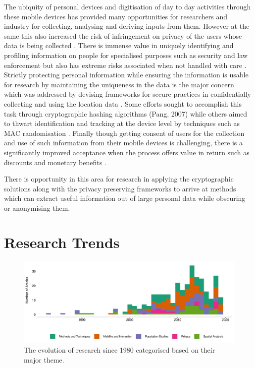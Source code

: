The ubiquity of personal devices and digitisation of day to day activities through these mobile devices \citep{mcmeel2018} has provided many opportunities for researchers and industry for collecting, analysing and deriving inputs from them.
However at the same this also increased the risk of infringement on privacy of the users whose data is being collected \cite[-2cm]{saponas2007, krumm2009}.
There is immense value in uniquely identifying and profiling information on people for specialised purposes such as security \citep{cutter2006} and law enforcement \citep{dobson2003} but also has extreme risks associated when not handled with care \citep{vanwey2005}.
Strictly protecting personal information while ensuring the information is usable for research by maintaining the uniqueness in the data is the major concern which was addressed by devising frameworks for secure practices in confidentially collecting and using the location data \citep{duckham2006, tang2006, lane2014}.  Some efforts sought to accomplish this task through cryptographic hashing algorithms (Pang, 2007) while others aimed to thwart identification and tracking at the device level by techniques such as MAC randomisation \citep{gruteser2005, greenstein2008}.
Finally though getting consent of users for the collection and use of such information from their mobile devices is challenging, there is a significantly improved acceptance when the process offers value in return such as discounts and monetary benefits \citep{kobsa2014}.

There is opportunity in this area for research in applying the cryptographic solutions along with the privacy preserving frameworks to arrive at methods which can extract useful information out of large personal data while obscuring or anonymising them.

\section{Research Trends}

\begin{figure}
  \includegraphics{images/literature-themes-timeline.png}
  \caption{The evolution of research since 1980 categorised based on their major theme.}
  \label{figure:literature:themes:timeline}
\end{figure}

